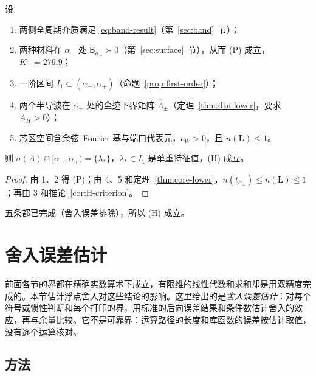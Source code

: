 \documentclass[11pt,a4paper,fontset=fandol]{ctexart}
\begin{document}
\begin{theorem}[(H) 的有限证书]
\label{thm:H-final}
设
\begin{enumerate}
\item 两侧全周期介质满足 \eqref{eq:band-result}（第~\ref{sec:band}~节）；
\item 两种材料在 $\alpha_-$ 处 $\mathsf B_{\alpha_-}\succ0$（第~\ref{sec:surface}~节），从而 (P) 成立，$K_+=279.9$；
\item 一阶区间 $I_1\subset(\alpha_-,\alpha_+)$（命题~\ref{prop:first-order}）；
\item 两个半导波在 $\alpha_+$ 处的全迹下界矩阵 $\hat\Lambda_\pm$（定理~\ref{thm:dtn-lower}，要求 $A_H>0$）；
\item 芯区空间含余弦--Fourier 基与端口代表元，$c_W>0$，且 $n(\bm L)\le1$。
\end{enumerate}
则 $\sigma(A)\cap[\alpha_-,\alpha_+)=\{\lambda_*\}$，$\lambda_*\in I_1$ 是单重特征值，(H) 成立。
\end{theorem}

\begin{proof}
由 1、2 得 (P)；由 4、5 和定理~\ref{thm:core-lower}，$n(t_{\alpha_+})\le n(\bm L)\le1$；再由 3 和推论~\ref{cor:H-criterion}。
\end{proof}

五条都已完成（舍入误差排除），所以 (H) 成立。

\section{舍入误差估计}
\label{sec:rounding}
前面各节的界都在精确实数算术下成立，有限维的线性代数和求和却是用双精度完成的。本节估计浮点舍入对这些结论的影响。这里给出的是\emph{舍入误差估计}：对每个符号或惯性判断和每个打印的界，用标准的后向误差结果和条件数估计舍入的效应，再与余量比较。它不是可靠界：运算路径的长度和库函数的误差按估计取值，没有逐个运算核对。

\subsection{方法}
\end{document}
